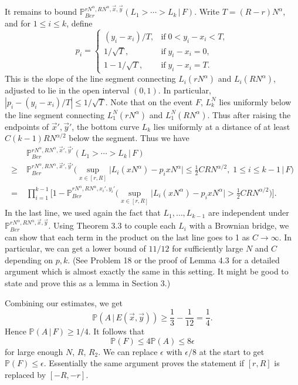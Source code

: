 \documentclass[12pt]{article}
\begin{document}
	It remains to bound $\mathbb{P}^{rN^\alpha, RN^\alpha,\vec{x},\vec{y}}_{Ber} (L_1 > \cdots > L_k\,|\,F)$. Write $T = (R-r)N^\alpha$, and for $1\leq i\leq k$, define
	\[
	p_i = \begin{cases}
	(y_i - x_i)/T, & \mathrm{if}\; 0 < y_i - x_i < T,\\
	1/\sqrt{T}, & \mathrm{if}\; y_i - x_i = 0,\\
	1-1/\sqrt{T}, & \mathrm{if}\;y_i - x_i = T.
	\end{cases}
	\]
	This is the slope of the line segment connecting $L_i(rN^\alpha)$ and $L_i(RN^\alpha)$, adjusted to lie in the open interval $(0,1)$. In particular, $|p_i - (y_i-x_i)/T| \leq 1/\sqrt{T}$. Note that on the event $F$, $L_k^N$ lies uniformly below the line segment connecting $L_1^N(rN^\alpha)$ and $L_1^N(RN^\alpha)$. Thus after raising the endpoints of $\vec{x}',\vec{y}'$, the bottom curve $L_k$ lies uniformly at a distance of at least $C(k-1)RN^{\alpha/2}$ below the segment.  
	Thus we have
	\begin{align*}
	&\mathbb{P}^{rN^\alpha, RN^\alpha,\vec{x}',\vec{y}'}_{Ber} (L_1 > \cdots > L_k\,|\,F)\\
	\geq \; & \mathbb{P}^{rN^\alpha, RN^\alpha,\vec{x}',\vec{y}'}_{Ber} \Big(\sup_{x\in[r,R]} |L_i(xN^\alpha) - p_ixN^\alpha\big| \leq \frac{1}{2}CRN^{\alpha/2}, \;1\leq i\leq k-1\,\Big|\,F\Big)\\
	= \; & \prod_{i=1}^{k-1}\Big[1 - \mathbb{P}^{rN^\alpha, RN^\alpha,x_i',y_i'}_{Ber} \Big(\sup_{x\in[r,R]} |L_i(xN^\alpha) - p_ixN^\alpha\big| > \frac{1}{2}CRN^{\alpha/2}\Big)\Big].
	\end{align*}
	In the last line, we used again the fact that $L_1,\dots,L_{k-1}$ are independent under $\mathbb{P}^{rN^\alpha, RN^\alpha,\vec{x},\vec{y}}_{Ber}$.  Using Theorem 3.3 to couple each $L_i$ with a Brownian bridge, we can show that each term in the product on the last line goes to 1 as $C\to\infty$. In particular, we can get a lower bound of $11/12$ for sufficiently large $N$ and $C$ depending on $p,k$. (See Problem 18 or the proof of Lemma 4.3 for a detailed argument which is almost exactly the same in this setting. It might be good to state and prove this as a lemma in Section 3.)
	
	Combining our estimates, we get
	\[
	\mathbb{P}(A\,|\,E(\vec{x},\vec{y})) \geq \frac{1}{3} - \frac{1}{12} = \frac{1}{4}.
	\]
	Hence $\mathbb{P}(A\,|\,F) \geq 1/4$. It follows that
	\[
	\mathbb{P}(F) \leq 4\mathbb{P}(A) \leq 8\epsilon
	\]
	for large enough $N$, $R$, $R_2$. We can replace $\epsilon$ with $\epsilon/8$ at the start to get $\mathbb{P}(F) \leq \epsilon$. Essentially the same argument proves the statement if $[r,R]$ is replaced by $[-R,-r]$.
\end{document}
